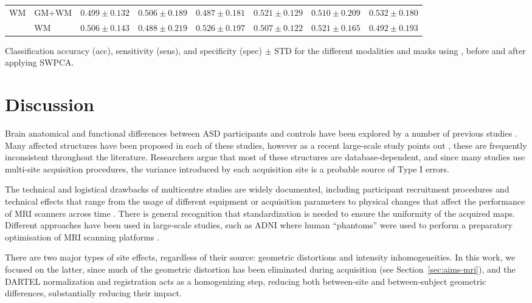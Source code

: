 \begin{bigtable}
\begin{tabularx}{\linewidth}{ll|XXX|XXX}
		\midrule
		\multirow{2}{*}{\ac{WM}} &GM+WM &
		$ 0.499 \pm 0.132 $ & $ 0.506 \pm 0.189 $ & $ 0.487 \pm 0.181 $ & $ 0.521 \pm 0.129 $ & $ 0.510 \pm 0.209 $ &  $ 0.532 \pm 0.180 $ \\
		&
		WM &
		$ 0.506 \pm 0.143 $ & $ 0.488 \pm 0.219 $ & $ 0.526 \pm 0.197 $ & $ 0.507 \pm 0.122 $ & $ 0.521 \pm 0.165 $ &   $ 0.492 \pm 0.193 $ \\
		\bottomrule
	\end{tabularx}
	\caption[Classification accuracy (acc), sensitivity (sens), and specificity (spec) $\pm$ STD for the different modalities and masks using \all{}, before and after applying \acs{SWPCA}.]{Classification accuracy (acc), sensitivity (sens), and specificity (spec) $\pm$ STD for the different modalities and masks using \all{}, before and after applying \ac{SWPCA}.}
	\label{tab:swpcaALL}
\end{bigtable}

\section{Discussion}
Brain anatomical and functional differences between \ac{ASD} participants and controls have been explored by a number of previous studies \cite{DiMartino2014,Ecker2015,Hernandez2015,Lenroot2013,Zuercher2015}. Many affected structures have been proposed in each of these studies, however as a recent large-scale study points out \cite{haar2014anatomical}, these are frequently inconsistent throughout the literature. Researchers argue that most of these structures are database-dependent, and since many studies use multi-site acquisition procedures, the variance introduced by each acquisition site is a probable source of Type I errors. 

The technical and logistical drawbacks of multicentre studies are widely documented, including participant recruitment procedures \cite{Pearlson2009} and technical effects that range from the usage of different equipment or acquisition parameters \cite{VanHorn2009} to physical changes that affect the performance of \ac{MRI} scanners across time \cite{Pearlson2009}. There is general recognition that standardization is needed to ensure the uniformity of the acquired maps. Different approaches have been used in large-scale studies, such as \ac{ADNI} where human ``phantoms'' were used to perform a preparatory optimisation of \ac{MRI} scanning platforms \cite{friedman2006report}. 

There are two major types of site effects, regardless of their source: geometric distortions and intensity inhomogeneities. In this work, we focused on the latter, since much of the geometric distortion has been eliminated during acquisition (see Section~\ref{sec:aims-mri}), and the DARTEL normalization and registration acts as a homogenizing step, reducing both between-site and between-subject geometric differences, substantially reducing their impact.

